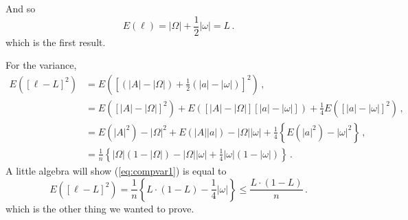 And so
\begin{equation*}
E(\ell)=|\Omega| + \frac{1}{2} |\omega| = L \,.
\end{equation*}
which is the first result.

For the variance,
\begin{align}
E([\ell-L]^2) &= E(\left[(|A|-|\Omega|) + \frac{1}{2}(|a|-|\omega|)\right]^2)  \,, \\
              &= E([|A|-|\Omega|]^2) + E([|A|-|\Omega|][|a|-|\omega|]) + \frac{1}{4} E([|a|-|\omega|]^2) \,, \\
              &= E(|A|^2)-|\Omega|^2 + E(|A||a|)-|\Omega||\omega| + \frac{1}{4} \left\{ E(|a|^2) - |\omega|^2 \right\} \,, \\
\label{eq:compvar1}
              &= \frac{1}{n} \left\{ |\Omega|(1-|\Omega|) -|\Omega||\omega| + \frac{1}{4}|\omega|(1-|\omega|) \right\} \,.
\end{align}
A little algebra will show (\ref{eq:compvar1}) is equal to
\begin{equation}
E([\ell-L]^2) = \frac{1}{n} \left\{ L \cdot (1-L) - \frac{1}{4} |\omega| \right \} \leq \frac{L \cdot (1-L)}{n} \,.
\end{equation}
which is the other thing we wanted to prove.
